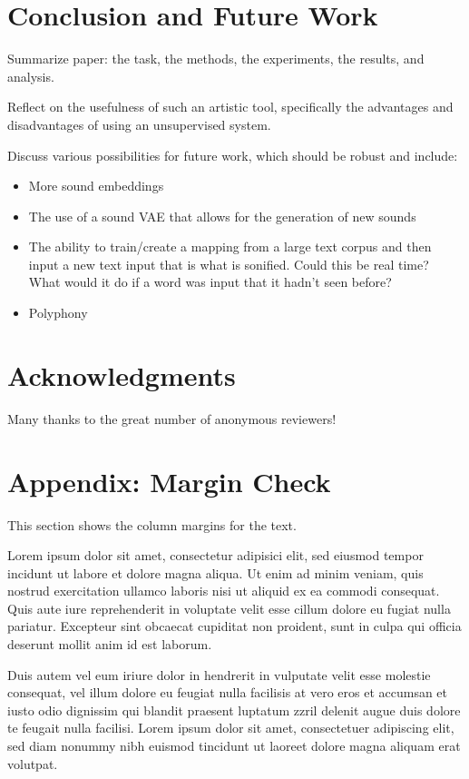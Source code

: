 \documentclass[twoside,a4paper]{article}
\begin{document}
\section{Conclusion and Future Work}
Summarize paper: the task, the methods, the experiments, the results, and analysis.

Reflect on the usefulness of such an artistic tool, specifically the advantages and disadvantages of using an unsupervised system.

Discuss various possibilities for future work, which should be robust and include:
\begin{itemize}
    \item More sound embeddings
    \item The use of a sound VAE that allows for the generation of new sounds
    \item The ability to train/create a mapping from a large text corpus and then input a new text input that is what is sonified. Could this be real time? What would it do if a word was input that it hadn’t seen before?
    \item Polyphony
\end{itemize}

\section{Acknowledgments}
Many thanks to the great number of anonymous reviewers!

\nocite{*}


\section{Appendix: Margin Check}
This section shows the column margins for the text. \bigskip\newline

Lorem ipsum dolor sit amet, consectetur adipisici elit, sed eiusmod tempor incidunt ut labore et dolore magna aliqua. Ut enim ad minim veniam, quis nostrud exercitation ullamco laboris nisi ut aliquid ex ea commodi consequat. Quis aute iure reprehenderit in voluptate velit esse cillum dolore eu fugiat nulla pariatur. Excepteur sint obcaecat cupiditat non proident, sunt in culpa qui officia deserunt mollit anim id est laborum.


Duis autem vel eum iriure dolor in hendrerit in vulputate velit esse molestie consequat, vel illum dolore eu feugiat nulla facilisis at vero eros et accumsan et iusto odio dignissim qui blandit praesent luptatum zzril delenit augue duis dolore te feugait nulla facilisi. Lorem ipsum dolor sit amet, consectetuer adipiscing elit, sed diam nonummy nibh euismod tincidunt ut laoreet dolore magna aliquam erat volutpat.
\end{document}

